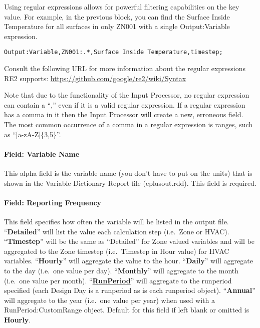 Using regular expressions allows for powerful filtering capabilities on the key value. For example, in the previous block, you can find the Surface Inside Temperature for all surfaces in only ZN001 with a single Output:Variable expression.

\begin{lstlisting}
Output:Variable,ZN001:.*,Surface Inside Temperature,timestep;
\end{lstlisting}

Consult the following URL for more information about the regular expressions RE2 supports: \url{https://github.com/google/re2/wiki/Syntax}

Note that due to the functionality of the Input Processor, no regular expression can contain a ``,'' even if it is a valid regular expression. If a regular expression has a comma in it then the Input Processor will create a new, erroneous field. The most common occurrence of a comma in a regular expression is ranges, such as ``[a-zA-Z]\{3,5\}''.

\paragraph{Field: Variable Name}\label{field-variable-name}

This alpha field is the variable name (you don't have to put on the units) that is shown in the Variable Dictionary Report file (eplusout.rdd). This field is required.

\paragraph{Field: Reporting Frequency}\label{field-reporting-frequency}

This field specifies how often the variable will be listed in the output file. ``\textbf{Detailed}'' will list the value each calculation step (i.e.~Zone or HVAC). ``\textbf{Timestep}'' will be the same as ``Detailed'' for Zone valued variables and will be aggregated to the Zone timestep (i.e.~Timestep in Hour value) for HVAC variables. ``\textbf{Hourly}'' will aggregate the value to the hour. ``\textbf{Daily}'' will aggregate to the day (i.e.~one value per day). ``\textbf{Monthly}'' will aggregate to the month (i.e.~one value per month). ``\textbf{\hyperref[runperiod]{RunPeriod}}'' will aggregate to the runperiod specified (each Design Day is a runperiod as is each runperiod object). ``\textbf{Annual}'' will aggregate to the year  (i.e.~one value per year) when used with a RunPeriod:CustomRange object. Default for this field if left blank or omitted is \textbf{Hourly}.

